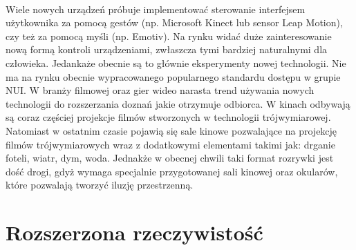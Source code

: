 \paragraph{}
Wiele nowych urządzeń próbuje implementować sterowanie interfejsem użytkownika za pomocą gestów (np. Microsoft Kinect\cite{kinect} lub sensor Leap Motion\cite{leap}), czy też za pomocą myśli (np. Emotiv\cite{emotiv}). Na rynku widać duże zainteresowanie nową formą kontroli urządzeniami, zwłaszcza tymi bardziej naturalnymi dla człowieka. Jedankaże obecnie są to głównie eksperymenty nowej technologii. Nie ma na rynku obecnie wypracowanego popularnego standardu dostępu w grupie NUI.
\newline
W branży filmowej oraz gier wideo narasta trend używania nowych technologii do rozszerzania doznań jakie otrzymuje odbiorca.
W kinach odbywają są coraz częściej projekcje filmów stworzonych w technologii trójwymiarowej. Natomiast w ostatnim czasie pojawią się sale kinowe pozwalające na projekcję filmów trójwymiarowych wraz z dodatkowymi elementami takimi jak: drganie foteli, wiatr, dym, woda\cite{cinema}. Jednakże w obecnej chwili taki format rozrywki jest dość drogi, gdyż wymaga specjalnie przygotowanej sali kinowej oraz okularów, które pozwalają tworzyć iluzję przestrzenną. 
\section*{Rozszerzona rzeczywistość}
